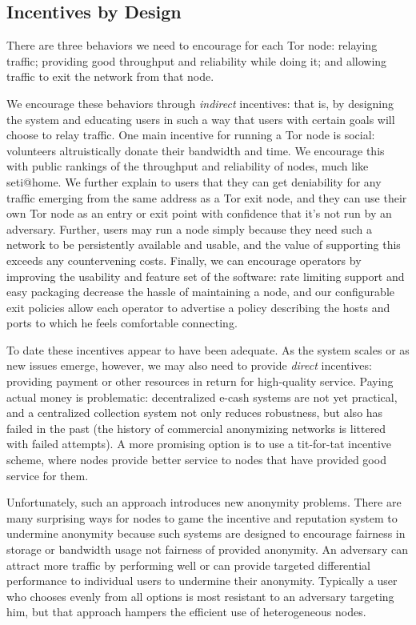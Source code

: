 \documentclass{llncs}
\begin{document}
\subsection{Incentives by Design}

There are three behaviors we need to encourage for each Tor node: relaying
traffic; providing good throughput and reliability while doing it;
and allowing traffic to exit the network from that node.

We encourage these behaviors through \emph{indirect} incentives: that
is, by designing the system and educating users in such a way that users
with certain goals will choose to relay traffic.  One
main incentive for running a Tor node is social: volunteers
altruistically donate their bandwidth and time.  We encourage this with
public rankings of the throughput and reliability of nodes, much like
seti@home.  We further explain to users that they can get
deniability for any traffic emerging from the same address as a Tor
exit node, and they can use their own Tor node
as an entry or exit point with confidence that it's not run by an adversary.
Further, users may run a node simply because they need such a network
to be persistently available and usable, and the value of supporting this
exceeds any countervening costs.
Finally, we can encourage operators by improving the usability and feature
set of the software:
rate limiting support and easy packaging decrease the hassle of
maintaining a node, and our configurable exit policies allow each
operator to advertise a policy describing the hosts and ports to which
he feels comfortable connecting.

To date these incentives appear to have been adequate. As the system scales
or as new issues emerge, however, we may also need to provide
 \emph{direct} incentives:
providing payment or other resources in return for high-quality service.
Paying actual money is problematic: decentralized e-cash systems are
not yet practical, and a centralized collection system not only reduces
robustness, but also has failed in the past (the history of commercial
anonymizing networks is littered with failed attempts).  A more promising
option is to use a tit-for-tat incentive scheme, where nodes provide better
service to nodes that have provided good service for them.

Unfortunately, such an approach introduces new anonymity problems.
There are many surprising ways for nodes to game the incentive and
reputation system to undermine anonymity because such systems are
designed to encourage fairness in storage or bandwidth usage not
fairness of provided anonymity. An adversary can attract more traffic
by performing well or can provide targeted differential performance to
individual users to undermine their anonymity. Typically a user who
chooses evenly from all options is most resistant to an adversary
targeting him, but that approach hampers the efficient use
of heterogeneous nodes.
\end{document}
